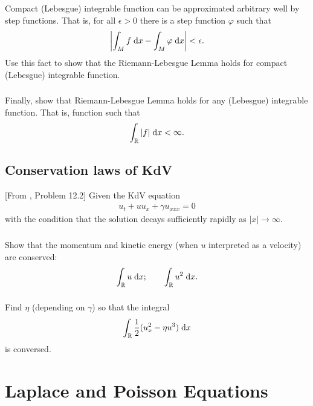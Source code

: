 \documentclass[11pt,letterpaper]{report}
\begin{document}
\subsection{}
Compact (Lebesgue) integrable function can be approximated arbitrary well by step functions. That is, for all $\epsilon>0$ there is a step function $\varphi$ such that
\begin{align}
    \left| \int_M f \;\mathrm{d} x - \int_M \varphi \;\mathrm{d} x \right| < \epsilon.
\end{align}
Use this fact to show that the Riemann-Lebesgue Lemma holds for compact (Lebesgue) integrable function.

\subsection{}
Finally, show that Riemann-Lebesgue Lemma holds for any (Lebesgue) integrable function. That is, function such that
\begin{align}
    \int_\mathbb{R} |f|\;\mathrm{d} x < \infty.
\end{align}

\section{Conservation laws of KdV}
[From \cite{ShearerLevy_15}, Problem 12.2] Given the KdV equation
\begin{align}
    u_t+uu_x+\gamma u_{xxx} = 0
\end{align}
with the condition that the solution decays sufficiently rapidly as $|x|\to\infty$.

\subsection{}
Show that the momentum and kinetic energy (when $u$ interpreted as a velocity) are conserved:
\begin{align}
    \int_\mathbb{R} u\;\mathrm{d} x; \qquad \int_\mathbb{R} u^2\;\mathrm{d} x.
\end{align}

\subsection{}
Find $\eta$ (depending on $\gamma$) so that the integral
\begin{align}
    \int_\mathbb{R} \frac{1}{2}(u_x^2-\eta u^3)\;\mathrm{d} x
\end{align}
is conversed. 

\chapter{Laplace and Poisson Equations}
\end{document}
